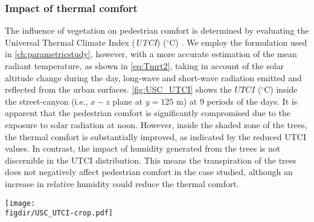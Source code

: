 

\subsubsection*{Impact of thermal comfort}

The influence of vegetation on pedestrian comfort is determined by evaluating the Universal Thermal Climate Index (\textit{UTCI}) ($^{\circ}$C) \citep{Fiala2001,Manickathan2018a}. We employ the formulation used in \cref{ch:parametricstudy}, however, with a more accurate estimation of the mean radiant temperature, as shown in \cref{eq:Tmrt2}, taking in account of the solar altitude change during the day, long-wave and short-wave radiation emitted and reflected from the urban surfaces. \cref{fig:USC_UTCI} shows the $\textit{UTCI}$ ($^{\circ}$C) inside the street-canyon (i.e., $x-z$ plane at $y=125$ m) at 9 periods of the days. It is apparent that the pedestrian comfort is significantly compromised due to the exposure to solar radiation at noon. However, inside the shaded zone of the trees, the thermal comfort is substantially improved, as indicated by the reduced UTCI values. In contrast, the impact of humidity generated from the trees is not discernible in the UTCI distribution. This means the transpiration of the trees does not negatively affect pedestrian comfort in the case studied, although an increase in relative humidity could reduce the thermal comfort.


\begin{sidewaysfigure}[p]
	\centering
	\texttt{[image: \\figdir/USC\_UTCI-crop.pdf]}
	\caption{Universal thermal climate index $\textit{UTCI}$ ($^{\circ}$C) inside the street-canyon where the vegetation zone is indicated by a green box. The plot shows the fields with a $150$ minutes interval from $03$:$00$ (HH:MM) to $23$:$00$ (HH:MM).}
	\label{fig:USC_UTCI}
\end{sidewaysfigure}

